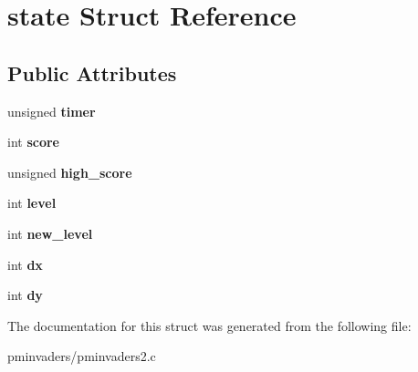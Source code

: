 \hypertarget{structstate}{}\section{state Struct Reference}
\label{structstate}
\subsection*{Public Attributes}
\begin{DoxyCompactItemize}
\item 
\mbox{\label{structstate_a4adc8c648b4707dbb132e1a0d74f11dc}} 
unsigned {\bfseries timer}
\item 
\mbox{\label{structstate_a07a38cbc6606a3a3ad14051b6c7f02fa}} 
int {\bfseries score}
\item 
\mbox{\label{structstate_aa319e97149e774818e1bf43ad954753f}} 
unsigned {\bfseries high\+\_\+score}
\item 
\mbox{\label{structstate_a7019d9ec2e0ba825578ce8ea79bfc59f}} 
int {\bfseries level}
\item 
\mbox{\label{structstate_a7ed5bde1731aba93a029fbc0d71f2334}} 
int {\bfseries new\+\_\+level}
\item 
\mbox{\label{structstate_a64b0d24a91aad0bb65e0aefd24dea52b}} 
int {\bfseries dx}
\item 
\mbox{\label{structstate_a1949291db38ae179c65c27ad48198391}} 
int {\bfseries dy}
\end{DoxyCompactItemize}


The documentation for this struct was generated from the following file\+:\begin{DoxyCompactItemize}
\item 
pminvaders/pminvaders2.\+c\end{DoxyCompactItemize}
